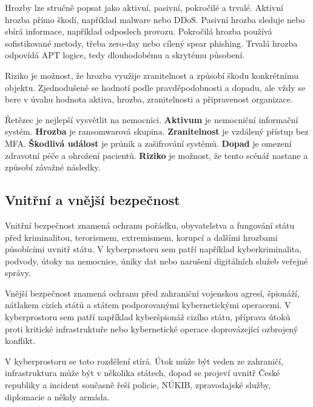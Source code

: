 Hrozby lze stručně popsat jako aktivní, pasivní, pokročilé a trvalé. Aktivní hrozba přímo škodí, například malware nebo DDoS. Pasivní hrozba sleduje nebo sbírá informace, například odposlech provozu. Pokročilá hrozba používá sofistikované metody, třeba zero-day nebo cílený spear phishing. Trvalá hrozba odpovídá APT logice, tedy dlouhodobému a skrytému působení.

Riziko je možnost, že hrozba využije zranitelnost a způsobí škodu konkrétnímu objektu. Zjednodušeně se hodnotí podle pravděpodobnosti a dopadu, ale vždy se bere v úvahu hodnota aktiva, hrozba, zranitelnosti a připravenost organizace.

Řetězec je nejlepší vysvětlit na nemocnici. \textbf{Aktivum} je nemocniční informační systém. \textbf{Hrozba} je ransomwarová skupina. \textbf{Zranitelnost} je vzdálený přístup bez MFA. \textbf{Škodlivá událost} je průnik a zašifrování systémů. \textbf{Dopad} je omezení zdravotní péče a ohrožení pacientů. \textbf{Riziko} je možnost, že tento scénář nastane a způsobí závažné následky.


\subsection*{Vnitřní a vnější bezpečnost}
Vnitřní bezpečnost znamená ochranu pořádku, obyvatelstva a fungování státu před kriminalitou, terorismem, extremismem, korupcí a dalšími hrozbami působícími uvnitř státu. V kyberprostoru sem patří například kyberkriminalita, podvody, útoky na nemocnice, úniky dat nebo narušení digitálních služeb veřejné správy.

Vnější bezpečnost znamená ochranu před zahraniční vojenskou agresí, špionáží, nátlakem cizích států a státem podporovanými kybernetickými operacemi. V kyberprostoru sem patří například kyberšpionáž cizího státu, příprava útoků proti kritické infrastruktuře nebo kybernetické operace doprovázející ozbrojený konflikt.

V kyberprostoru se toto rozdělení stírá. Útok může být veden ze zahraničí, infrastruktura může být v několika státech, dopad se projeví uvnitř České republiky a incident současně řeší policie, NÚKIB, zpravodajské služby, diplomacie a někdy armáda.


